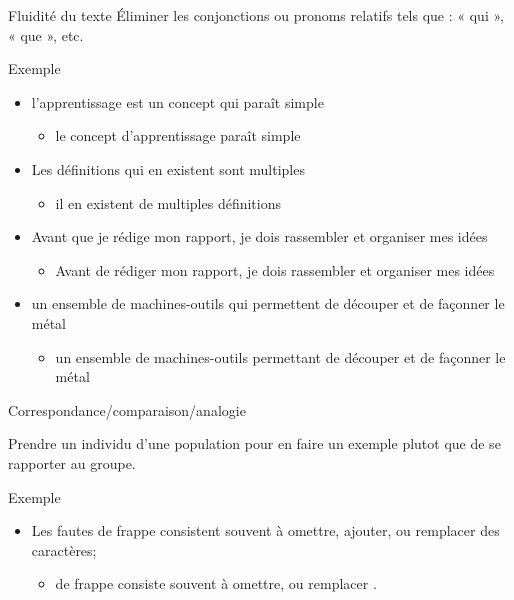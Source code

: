 \documentclass[french]{beamer}
\newcommand\red[1]{{\color{ulred}{\textbf{#1}}}}
\begin{document}
\begin{frame}{Fluidité du texte}
Éliminer les conjonctions ou pronoms relatifs tels que : « qui », « que », etc.

\begin{exampleblock}{Exemple}
	\begin{itemize}
		\item l'apprentissage est un concept qui paraît simple
		\begin{itemize}
			\item le concept d'apprentissage paraît simple
		\end{itemize}
		\item Les définitions qui en existent sont multiples
		\begin{itemize}
			\item il en existent de multiples définitions
		\end{itemize}	
		\item Avant que je rédige mon rapport, je dois rassembler et organiser mes idées
		\begin{itemize}
			\item Avant de rédiger mon rapport, je dois rassembler et organiser mes idées
		\end{itemize}	
		\item un ensemble de machines-outils qui permettent de découper et de façonner le métal
		\begin{itemize}
			\item un ensemble de machines-outils permettant de découper et de façonner le métal
		\end{itemize}	
	\end{itemize}
\end{exampleblock}

\end{frame}

\begin{frame}{Correspondance/comparaison/analogie}

Prendre un individu d'une population pour en faire un exemple plutot que de se rapporter au groupe.

\begin{exampleblock}{Exemple}
	\begin{itemize}
		\item Les fautes de frappe consistent souvent à omettre, ajouter, ou remplacer des caractères;
		\begin{itemize}
			\item \red{Une faute} de frappe consiste souvent à omettre, ou remplacer \red{un caractère}. 
		\end{itemize}
	\end{itemize}
\end{exampleblock}

\end{frame}
\end{document}
